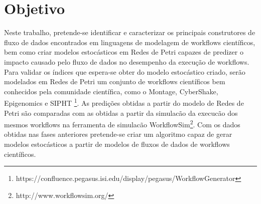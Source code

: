 \section{Objetivo}

		Neste trabalho, pretende-se identificar e caracterizar os principais construtores de fluxo de dados encontrados em linguagens de modelagem de workflows científicos, bem como criar modelos estocásticos em Redes de Petri capazes de predizer o impacto causado pelo fluxo de dados no desempenho da execução de workflows. Para validar os índices que espera-se obter do modelo estocástico criado, serão modelados em Redes de Petri um conjunto de workflows científicos bem conhecidos pela comunidade científica, como o Montage, CyberShake, Epigenomics e SIPHT \footnote{https://confluence.pegasus.isi.edu/display/pegasus/WorkflowGenerator}. As predições obtidas a partir do modelo de Redes de Petri são comparadas com as obtidas a partir da simulacão da execucão dos mesmos workflows na ferramenta de simulacão WorkflowSim\footnote{http://www.workflowsim.org/}.	Com os dados obtidas nas fases anteriores pretende-se criar um algoritmo capaz de gerar modelos estocásticos a partir de modelos de fluxos de dados de workflows científicos.
